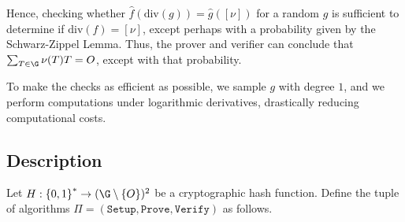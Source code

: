 \documentclass[11pt,letterpaper]{article}
\theoremstyle{definition}
\newcommand{\6}{\mathbf}
\newcommand{\7}{\mathcal}
\begin{document}
Hence, checking whether $\widehat{f}(\text{div}(g)) = \widehat{g}([\nu])$ for a random $g$ is sufficient to determine if $\text{div}(f) = [\nu]$, except perhaps with a probability given by the Schwarz-Zippel Lemma. Thus, the prover and verifier can conclude that $\sum_{T \in \G} \nu(T) T = O$, except with that probability. 

To make the checks as efficient as possible, we sample $g$ with degree $1$, and we perform computations under logarithmic derivatives, drastically reducing computational costs.


\subsection{Description}


Let $H:\left\{0,1\right\}^* \to (\G\setminus\left\{O\right\})^2$ be a cryptographic hash function. Define the tuple of algorithms $\Pi = (\texttt{Setup}, \texttt{Prove}, \texttt{Verify})$ as follows. 
\end{document}
